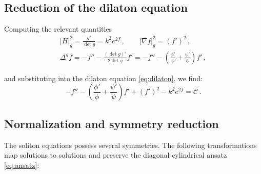 \documentclass[12pt,a4paper,reqno]{amsart}
\theoremstyle{plain}
\theoremstyle{remark}
\numberwithin{equation}{section}
\newcommand{\cC}{\mathcal{C}}
\begin{document}

\subsection{Reduction of the dilaton equation}
\label{sec:reductionsoliton}

Computing the relevant quantities
\begin{gather*}
|H|_g^2 = \frac{h^2}{\det g} = k^2 e^{2f} \,, \qquad |\nabla f|_g^2 = (f')^2 \,, \\
\Delta^g f = - f'' - \frac{(\det g)'}{2\det g} f' = - f'' - \left( \frac{\phi'}{\phi} + \frac{\psi'}{\psi} \right) f' \,,
\end{gather*}

and substituting into the dilaton equation \eqref{eq:dilaton}, we find:
\begin{equation}\label{eq:conservationlawreduced}
- f'' - \left( \frac{\phi'}{\phi} + \frac{\psi'}{\psi} \right) f' + (f')^2 - k^2 e^{2f} = \cC \,.
\end{equation}


\subsection{Normalization and symmetry reduction}
\label{sec:normalization}

The soliton equations possess several symmetries. The following transformations map solutions to solutions and preserve the diagonal cylindrical ansatz \eqref{eq:ansatz}:
\end{document}
